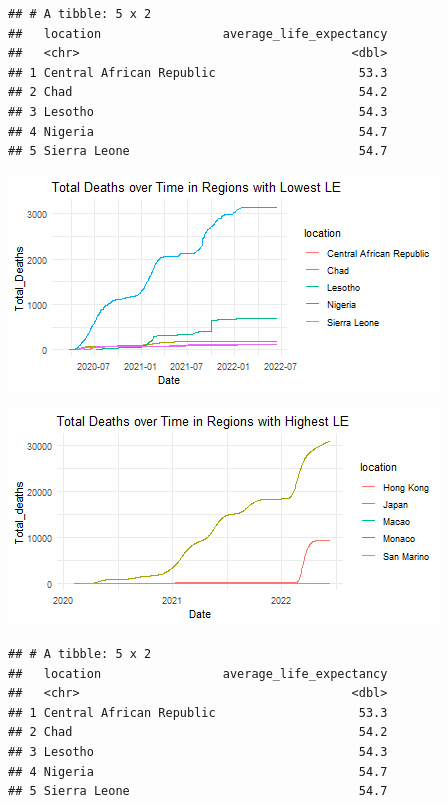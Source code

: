 \documentclass[11pt,preprint, authoryear]{elsarticle}
\let\origfigure\figure
\let\endorigfigure\endfigure
\renewenvironment{figure}[1][2] {
    \expandafter\origfigure\expandafter[H]
} {
    \endorigfigure
}
\numberwithin{equation}{section}
\numberwithin{figure}{section}
\numberwithin{table}{section}
\begin{document}
\begin{verbatim}
## # A tibble: 5 x 2
##   location                 average_life_expectancy
##   <chr>                                      <dbl>
## 1 Central African Republic                    53.3
## 2 Chad                                        54.2
## 3 Lesotho                                     54.3
## 4 Nigeria                                     54.7
## 5 Sierra Leone                                54.7
\end{verbatim}

\begin{figure}[H]

{\centering \includegraphics{Q1_files/figure-latex/Figure2-1} 

}

\caption{Caption Here \label{Figure2}}\label{fig:Figure2-1}
\end{figure}
\begin{figure}[H]

{\centering \includegraphics{Q1_files/figure-latex/Figure2-2} 

}

\caption{Caption Here \label{Figure2}}\label{fig:Figure2-2}
\end{figure}

\begin{verbatim}
## # A tibble: 5 x 2
##   location                 average_life_expectancy
##   <chr>                                      <dbl>
## 1 Central African Republic                    53.3
## 2 Chad                                        54.2
## 3 Lesotho                                     54.3
## 4 Nigeria                                     54.7
## 5 Sierra Leone                                54.7
\end{verbatim}
\end{document}
